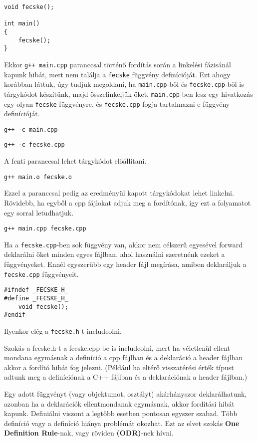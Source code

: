 \documentclass[../cpp_book/cpp_book.tex]{subfiles}
\begin{document}
	\smallskip
	\begin{lstlisting}
void fecske();

int main()
{
	fecske();
}
	\end{lstlisting}
	Ekkor \texttt{g++ main.cpp} paranccsal történő fordítás során a linkelési fázisánál kapunk hibát, mert nem találja a \texttt{fecske} függvény definícióját. Ezt ahogy korábban láttuk, úgy tudjuk megoldani, ha \texttt{main.cpp}-ből és \texttt{fecske.cpp}-ből is tárgykódot készítünk, majd összelinkeljük őket. \texttt{main.cpp}-ben lesz egy hivatkozás egy olyan \texttt{fecske} függvényre, és \texttt{fecske.cpp} fogja tartalmazni e függvény definícióját. 
		
    {\centering\texttt{g++ -c main.cpp}\par}

	{\centering\texttt{g++ -c fecske.cpp}\par}

	A fenti paranccsal lehet tárgykódot előállítani.
	
	{\centering\texttt{g++ main.o fecske.o}\par}
	
	Ezzel a paranccsal pedig az eredményül kapott tárgykódokat lehet linkelni. Rövidebb, ha egyből a cpp fájlokat adjuk meg a fordítónak, így ezt a folyamatot egy sorral letudhatjuk.

	{\centering\texttt{g++ main.cpp fecske.cpp} \par}
	
	Ha a \texttt{fecske.cpp}-ben sok függvény van, akkor nem célszerű egyesével forward deklarálni őket minden egyes fájlban, ahol használni szeretnénk ezeket a függvényeket. Ennél egyszerűbb egy header fájl megírása, amiben deklaráljuk a \texttt{fecske.cpp} függvényeit.
	\bigskip
	
	\begin{lstlisting}
#ifndef _FECSKE_H_
#define _FECSKE_H_
	void fecske();
#endif
	\end{lstlisting}
	Ilyenkor elég a \texttt{fecske.h}-t includeolni.
	
	Szokás a fecske.h-t a fecske.cpp-be is includeolni, mert ha véletlenül ellent mondana egymásnak a definíció a cpp fájlban és a deklaráció a header fájlban akkor a fordító hibát fog jelezni. (Például ha eltérő visszatérési érték típust adtunk meg a definíciónak a C++ fájlban és a deklarációnak a header fájlban.)
	
	Egy adott függvényt (vagy objektumot, osztályt) akárhányszor deklarálhatunk, azonban ha a deklarációk ellentmondanak egymásnak, akkor fordítási hibát kapunk. Definiálni viszont a legtöbb esetben pontosan egyszer szabad. Több definíció vagy a definíció hiánya problémát okozhat. Ezt az elvet szokás \textbf{One Definition Rule}-nak, vagy röviden \textbf{(ODR)}-nek hívni.
	\bigskip
	
\end{document}

